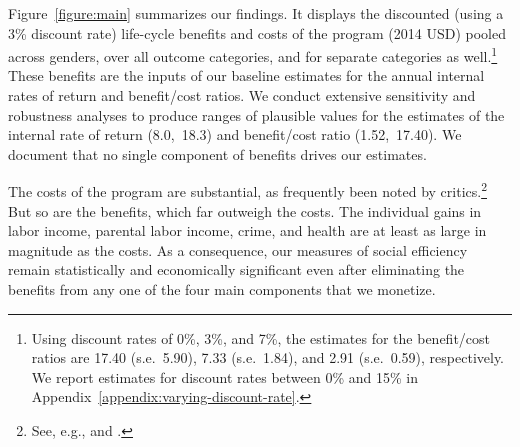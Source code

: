 \noindent Figure~\ref{figure:main} summarizes our findings. It displays the discounted (using a 3\% discount rate) life-cycle benefits and costs of the program (2014 USD) pooled across genders, over all outcome categories, and for separate categories as well.\footnote{Using discount rates of 0\%, 3\%, and 7\%, the estimates for the benefit/cost ratios are 17.40 (s.e.\ 5.90), 7.33 (s.e.\ 1.84), and 2.91 (s.e.\ 0.59), respectively. We report estimates for discount rates between 0\% and 15\% in  Appendix~\ref{appendix:varying-discount-rate}.} These benefits are the inputs of our baseline estimates for the annual internal rates of return and benefit/cost ratios. We conduct extensive sensitivity and robustness analyses to produce ranges of plausible values for the estimates of the internal rate of return (8.0,\ 18.3) and benefit/cost ratio (1.52,\ 17.40). We document that no single component of benefits drives our estimates.

The costs of the program are substantial, as frequently been noted by critics.\footnote{See, e.g., \citet{Fox_News_2014_Head_Start_Effects} and \citet{Whitehurst_2014_Senate_Testimony}.} But so are the benefits, which far outweigh the costs. The individual gains in labor income, parental labor income, crime, and health are at least as large in magnitude as the costs. As a consequence, our measures of social efficiency remain statistically and economically significant even after eliminating the benefits from any one of the four main components that we monetize. 

